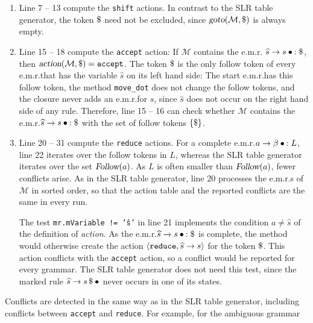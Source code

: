 \begin{enumerate}
\item Line 7 -- 13 compute the \texttt{shift} actions.  In contrast to the SLR table generator, the token
      $\symbol{36}$ need not be excluded, since $\textsl{goto}(\mathcal{M}, \symbol{36})$ is always empty.
\item Line 15 -- 18 compute the \texttt{accept} action:  If $\mathcal{M}$ contains the e.m.r.\@
      $\widehat{s} \rightarrow s \mdot: \symbol{36}$, then $\textsl{action}(\mathcal{M}, \symbol{36}) =
      \texttt{accept}$.  The token $\symbol{36}$ is the only follow token of every e.m.r.\@ that has the variable
      $\widehat{s}$ on its left hand side:  The start e.m.r.\@ has this follow token, the method \texttt{move\_dot}
      does not change the follow tokens, and the closure never adds an e.m.r.\@ for $\widehat{s}$, since
      $\widehat{s}$ does not occur on the right hand side of any rule.  Therefore, line 15 -- 16 can check whether
      $\mathcal{M}$ contains the e.m.r.\@ $\widehat{s} \rightarrow s \mdot: \symbol{36}$ with the set of follow
      tokens $\{\symbol{36}\}$.
\item Line 20 -- 31 compute the \texttt{reduce} actions.  For a complete e.m.r.\@ $a \rightarrow \beta \mdot: L$,
      line 22 iterates over the follow tokens in $L$, whereas the SLR table generator iterates over the set
      $\textsl{Follow}(a)$.  As $L$ is often smaller than $\textsl{Follow}(a)$, fewer conflicts arise.  As in the
      SLR table generator, line 20 processes the e.m.r.s of $\mathcal{M}$ in sorted order, so that the action table
      and the reported conflicts are the same in every run.

      The test \texttt{mr.mVariable != 'ŝ'} in line 21 implements the condition $a \not= \widehat{s}$ of the
      definition of \textsl{action}.  As the e.m.r.\@ $\widehat{s} \rightarrow s \mdot: \symbol{36}$ is
      complete, the method would otherwise create the action $\pair(\texttt{reduce}, \widehat{s} \rightarrow s)$
      for the token $\symbol{36}$.  This action conflicts with the \texttt{accept} action, so a conflict would be
      reported for every grammar.  The SLR table generator does not need this test, since the marked rule
      $\widehat{s} \rightarrow s\, \symbol{36} \mdot$ never occurs in one of its states.
\end{enumerate}
Conflicts are detected in the same way as in the SLR table generator, including conflicts between \texttt{accept}
and \texttt{reduce}.  For example, for the ambiguous grammar
